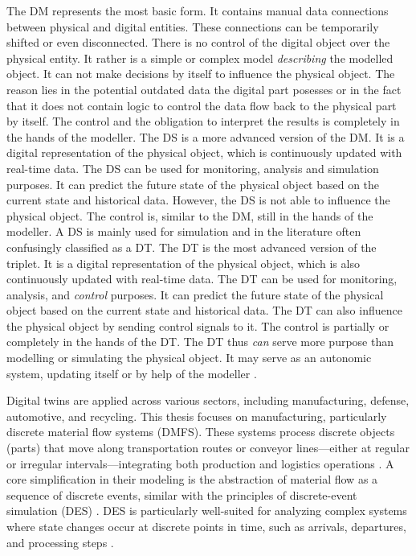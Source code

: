 The DM represents the most basic form. It contains manual data connections between physical and digital entities. These connections can be temporarily shifted or even disconnected. There is no control of the digital object over the physical entity. It rather is a simple or complex model \textit{describing} the modelled object. It can not make decisions by itself to influence the physical object. The reason lies in the potential outdated data the digital part posesses or in the fact that it does not contain logic to control the data flow back to the physical part by itself. The control and the obligation to interpret the results is completely in the hands of the modeller.
The DS is a more advanced version of the DM. It is a digital representation of the physical object, which is continuously updated with real-time data. The DS can be used for monitoring, analysis and simulation purposes. It can predict the future state of the physical object based on the current state and historical data. However, the DS is not able to influence the physical object. The control is, similar to the DM, still in the hands of the modeller. A DS is mainly used for simulation and in the literature often confusingly classified as a DT.
The DT is the most advanced version of the triplet. It is a digital representation of the physical object, which is also continuously updated with real-time data. The DT can be used for monitoring, analysis, and \textit{control} purposes. It can predict the future state of the physical object based on the current state and historical data. The DT can also influence the physical object by sending control signals to it. The control is partially or completely in the hands of the DT. The DT thus \textit{can} serve more purpose than modelling or simulating the physical object. It may serve as an autonomic system, updating itself or by help of the modeller \parencite{kritzinger2018digital}.

Digital twins are  applied across various sectors, including manufacturing, defense, automotive, and recycling. This thesis focuses on manufacturing, particularly discrete material flow systems (DMFS). These systems process discrete objects (parts) that move along transportation routes or conveyor lines—either at regular or irregular intervals—integrating both production and logistics operations \parencite{arnold2005materialfluss, schwede2024learning}. A core simplification in their modeling is the abstraction of material flow as a sequence of discrete events, similar with the principles of discrete-event simulation (DES) \parencite{kovacs2016mathematical, robinson2014simulation}. DES is particularly well-suited for analyzing complex systems where state changes occur at discrete points in time, such as arrivals, departures, and processing steps \parencite{robinson2014simulation}.

